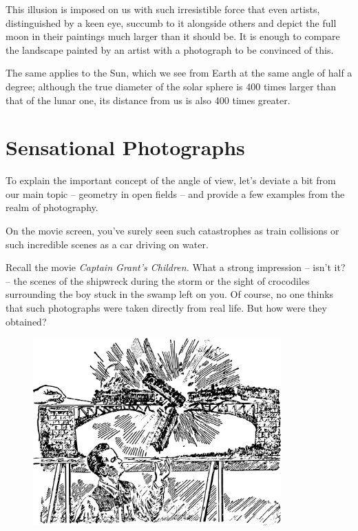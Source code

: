 This illusion is imposed on us with such irresistible force that even artists, distinguished by a keen eye, succumb to it alongside others and depict the full moon in their paintings much larger than it should be. It is enough to compare the landscape painted by an artist with a photograph to be convinced of this.

The same applies to the Sun, which we see from Earth at the same angle of half a degree; although the true diameter of the solar sphere is 400 times larger than that of the lunar one, its distance from us is also 400 times greater.


\section{Sensational Photographs}
\label{sec-3.5}

To explain the important concept of the angle of view, let's deviate a bit from our main topic -- geometry in open fields -- and provide a few examples from the realm of photography.

On the movie screen, you've surely seen such catastrophes as train collisions or such incredible scenes as a car driving on water.

Recall the movie \emph{Captain Grant's Children.} What a strong impression -- isn't it? -- the scenes of the shipwreck during the storm or the sight of crocodiles surrounding the boy stuck in the swamp left on you. Of course, no one thinks that such photographs were taken directly from real life. But how were they obtained?
\begin{figure}[h!]
\centering
\includegraphics[width=0.85\textwidth]{figures/ch-03/fig-063.pdf}
\end{figure}


